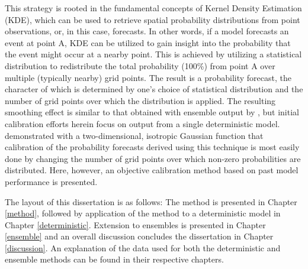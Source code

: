 This strategy is rooted in the fundamental concepts of Kernel Density Estimation (KDE), which can be used to retrieve spatial probability distributions from point observations, or, in this case, forecasts.
In other words, if a model forecasts an event at point A, KDE can be utilized to gain insight into the probability that the event might occur at a nearby point.
This is achieved by utilizing a statistical distribution to redistribute the total probability (100\%) from point A over multiple (typically nearby) grid points.
The result is a probability forecast, the character of which is determined by one's choice of statistical distribution and the number of grid points over which the distribution is applied.
The resulting smoothing effect is similar to that obtained with ensemble output by \cite{Wilks2002}, but initial calibration efforts herein focus on output from a single deterministic model.
\cite{Sobash2011} demonstrated with a two-dimensional, isotropic Gaussian function that calibration of the probability forecasts derived using this technique is most easily done by changing the number of grid points over which non-zero probabilities are distributed.
Here, however, an objective calibration method based on past model performance is presented.


The layout of this dissertation is as follows: The method is presented in Chapter \ref{method}, followed by application of the method to a deterministic model in Chapter \ref{deterministic}.
Extension to ensembles is presented in Chapter \ref{ensemble} and an overall discussion concludes the dissertation in Chapter \ref{discussion}.
An explanation of the data used for both the deterministic and ensemble methods can be found in their respective chapters.


